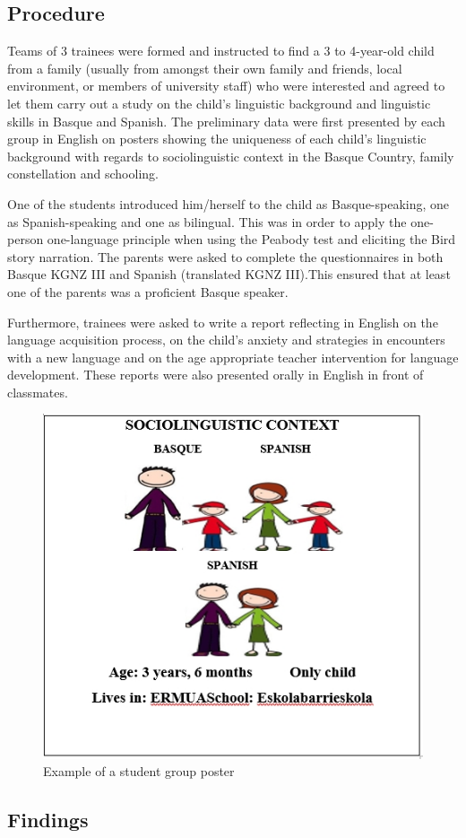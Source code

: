 \documentclass[output=paper]{../langscibook}
\begin{document}
\subsection{Procedure}

Teams of 3 trainees were formed and instructed to find a 3 to 4-year-old child from a family (usually from amongst their own family and friends, local environment, or members of university staff) who were interested and agreed to let them carry out a study on the child’s linguistic background and linguistic skills in Basque and Spanish. The preliminary data were first presented by each group in English on posters showing the uniqueness of each child’s linguistic background with regards to sociolinguistic context in the Basque Country, family constellation and schooling.

One of the students introduced him/herself to the child as Basque-speaking, one as Spanish-speaking and one as bilingual. This was in order to apply the one-person one-language principle when using the Peabody test and eliciting the Bird story narration. The parents were asked to complete the questionnaires in both Basque KGNZ III and Spanish (translated KGNZ III).This ensured that at least one of the parents was a proficient Basque speaker.

Furthermore, trainees were asked to write a report reflecting in English on the language acquisition process, on the child’s anxiety and strategies in encounters with a new language and on the age appropriate teacher intervention for language development. These reports were also presented orally in English in front of classmates.


\begin{figure}
  \includegraphics[width=.5\textwidth]{figures/Chapter6-img002-Edited.jpg}
  \caption{Example of a student group poster}
\end{figure}


\subsection{Findings}
\end{document}
